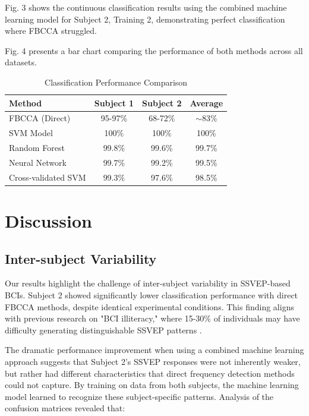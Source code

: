 \documentclass[conference]{IEEEtran}
\begin{document}
Fig. 3 shows the continuous classification results using the combined machine learning model for Subject 2, Training 2, demonstrating perfect classification where FBCCA struggled.

Fig. 4 presents a bar chart comparing the performance of both methods across all datasets.

\begin{table}[h]
\caption{Classification Performance Comparison}
\label{tab:performance}
\centering
\begin{tabular}{lccc}
\toprule
\textbf{Method} & \textbf{Subject 1} & \textbf{Subject 2} & \textbf{Average} \\
\midrule
FBCCA (Direct) & 95-97\% & 68-72\% & $\sim$83\% \\
SVM Model & 100\% & 100\% & 100\% \\
Random Forest & 99.8\% & 99.6\% & 99.7\% \\
Neural Network & 99.7\% & 99.2\% & 99.5\% \\
Cross-validated SVM & 99.3\% & 97.6\% & 98.5\% \\
\bottomrule
\end{tabular}
\end{table}

\section{Discussion}

\subsection{Inter-subject Variability}
Our results highlight the challenge of inter-subject variability in SSVEP-based BCIs. Subject 2 showed significantly lower classification performance with direct FBCCA methods, despite identical experimental conditions. This finding aligns with previous research on "BCI illiteracy," where 15-30\% of individuals may have difficulty generating distinguishable SSVEP patterns \cite{allison2010toward}.

The dramatic performance improvement when using a combined machine learning approach suggests that Subject 2's SSVEP responses were not inherently weaker, but rather had different characteristics that direct frequency detection methods could not capture. By training on data from both subjects, the machine learning model learned to recognize these subject-specific patterns. Analysis of the confusion matrices revealed that:
\end{document}
